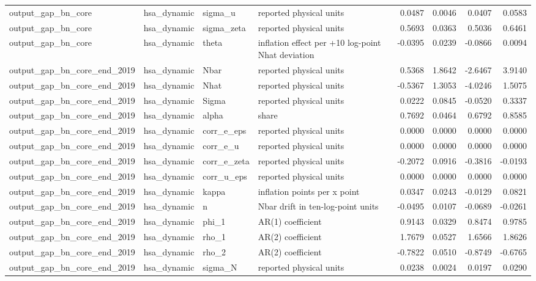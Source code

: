 \begin{tabular}{llllrrrr}
output\_gap\_bn\_core & hsa\_dynamic & sigma\_u & reported physical units & 0.0487 & 0.0046 & 0.0407 & 0.0583 \\
output\_gap\_bn\_core & hsa\_dynamic & sigma\_zeta & reported physical units & 0.5693 & 0.0363 & 0.5036 & 0.6461 \\
output\_gap\_bn\_core & hsa\_dynamic & theta & inflation effect per +10 log-point Nhat deviation & -0.0395 & 0.0239 & -0.0866 & 0.0094 \\
output\_gap\_bn\_core\_end\_2019 & hsa\_dynamic & Nbar & reported physical units & 0.5368 & 1.8642 & -2.6467 & 3.9140 \\
output\_gap\_bn\_core\_end\_2019 & hsa\_dynamic & Nhat & reported physical units & -0.5367 & 1.3053 & -4.0246 & 1.5075 \\
output\_gap\_bn\_core\_end\_2019 & hsa\_dynamic & Sigma & reported physical units & 0.0222 & 0.0845 & -0.0520 & 0.3337 \\
output\_gap\_bn\_core\_end\_2019 & hsa\_dynamic & alpha & share & 0.7692 & 0.0464 & 0.6792 & 0.8585 \\
output\_gap\_bn\_core\_end\_2019 & hsa\_dynamic & corr\_e\_eps & reported physical units & 0.0000 & 0.0000 & 0.0000 & 0.0000 \\
output\_gap\_bn\_core\_end\_2019 & hsa\_dynamic & corr\_e\_u & reported physical units & 0.0000 & 0.0000 & 0.0000 & 0.0000 \\
output\_gap\_bn\_core\_end\_2019 & hsa\_dynamic & corr\_e\_zeta & reported physical units & -0.2072 & 0.0916 & -0.3816 & -0.0193 \\
output\_gap\_bn\_core\_end\_2019 & hsa\_dynamic & corr\_u\_eps & reported physical units & 0.0000 & 0.0000 & 0.0000 & 0.0000 \\
output\_gap\_bn\_core\_end\_2019 & hsa\_dynamic & kappa & inflation points per x point & 0.0347 & 0.0243 & -0.0129 & 0.0821 \\
output\_gap\_bn\_core\_end\_2019 & hsa\_dynamic & n & Nbar drift in ten-log-point units & -0.0495 & 0.0107 & -0.0689 & -0.0261 \\
output\_gap\_bn\_core\_end\_2019 & hsa\_dynamic & phi\_1 & AR(1) coefficient & 0.9143 & 0.0329 & 0.8474 & 0.9785 \\
output\_gap\_bn\_core\_end\_2019 & hsa\_dynamic & rho\_1 & AR(2) coefficient & 1.7679 & 0.0527 & 1.6566 & 1.8626 \\
output\_gap\_bn\_core\_end\_2019 & hsa\_dynamic & rho\_2 & AR(2) coefficient & -0.7822 & 0.0510 & -0.8749 & -0.6765 \\
output\_gap\_bn\_core\_end\_2019 & hsa\_dynamic & sigma\_N & reported physical units & 0.0238 & 0.0024 & 0.0197 & 0.0290 \\

\end{tabular}
